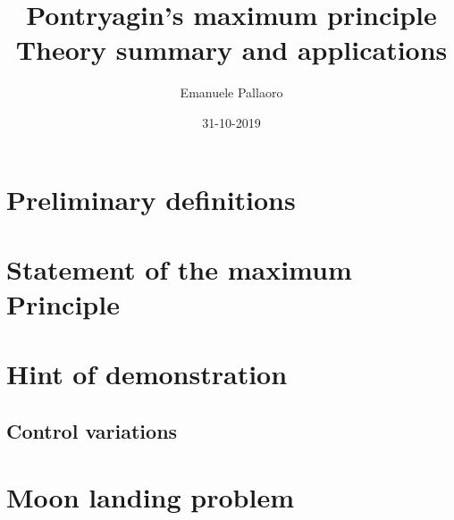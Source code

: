\documentclass[14pt]{article}
\title{%
	Pontryagin's maximum principle\\
	\large Theory summary and applications
}
\author{Emanuele Pallaoro}
\date{31-10-2019}
\numberwithin{equation}{section}
\begin{document}
\maketitle
\pagestyle{plain}

\section{Preliminary definitions}

\section{Statement of the maximum Principle}
%
\section{Hint of demonstration}
\subsection{Control variations}
\section{Moon landing problem}
\end{document}
